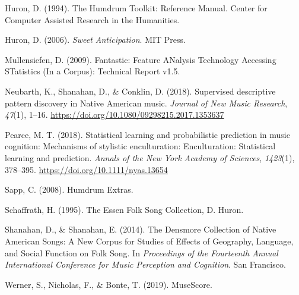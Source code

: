 \documentclass[english,man]{apa6}
\begin{document}
\leavevmode\hypertarget{ref-huronHumdrumToolkitReference1994}{}%
Huron, D. (1994). The Humdrum Toolkit: Reference Manual. Center for Computer Assisted Research in the Humanities.

\leavevmode\hypertarget{ref-huronSweetAnticipation2006}{}%
Huron, D. (2006). \emph{Sweet Anticipation}. MIT Press.

\leavevmode\hypertarget{ref-mullensiefenFantasticFeatureANalysis2009}{}%
Mullensiefen, D. (2009). Fantastic: Feature ANalysis Technology Accessing STatistics (In a Corpus): Technical Report v1.5.

\leavevmode\hypertarget{ref-neubarthSupervisedDescriptivePattern2018}{}%
Neubarth, K., Shanahan, D., \& Conklin, D. (2018). Supervised descriptive pattern discovery in Native American music. \emph{Journal of New Music Research}, \emph{47}(1), 1--16. \url{https://doi.org/10.1080/09298215.2017.1353637}

\leavevmode\hypertarget{ref-pearceStatisticalLearningProbabilistic2018a}{}%
Pearce, M. T. (2018). Statistical learning and probabilistic prediction in music cognition: Mechanisms of stylistic enculturation: Enculturation: Statistical learning and prediction. \emph{Annals of the New York Academy of Sciences}, \emph{1423}(1), 378--395. \url{https://doi.org/10.1111/nyas.13654}

\leavevmode\hypertarget{ref-sappHumdrumExtras2008}{}%
Sapp, C. (2008). Humdrum Extras.

\leavevmode\hypertarget{ref-schaffrathEssenFolkSong1995}{}%
Schaffrath, H. (1995). The Essen Folk Song Collection, D. Huron.

\leavevmode\hypertarget{ref-shanahanDensmoreCollectionNative2014}{}%
Shanahan, D., \& Shanahan, E. (2014). The Densmore Collection of Native American Songs: A New Corpus for Studies of Effects of Geography, Language, and Social Function on Folk Song. In \emph{Proceedings of the Fourteenth Annual International Conference for Music Perception and Cognition}. San Francisco.

\leavevmode\hypertarget{ref-wernerMuseScore2019}{}%
Werner, S., Nicholas, F., \& Bonte, T. (2019). MuseScore.

\endgroup
\end{document}
